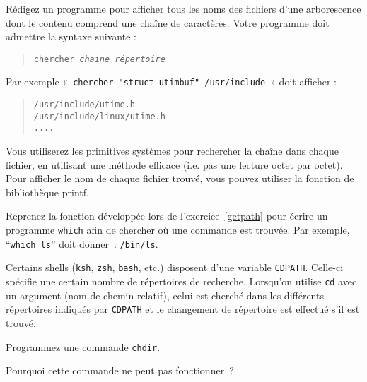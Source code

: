 Rédigez un programme pour afficher tous les noms des fichiers d'une
arborescence dont le contenu comprend une chaîne de caractères. Votre
programme doit admettre la syntaxe suivante :

\begin {quote}
\texttt {chercher \emph {chaine répertoire}}
\end {quote}

Par exemple «~\verb|chercher "struct utimbuf" /usr/include|~»
doit afficher :

\begin {quote}
\begin {verbatim}
/usr/include/utime.h
/usr/include/linux/utime.h
....
\end{verbatim}
\end {quote}

Vous utiliserez les primitives systèmes pour rechercher la chaîne dans
chaque fichier, en utilisant une méthode efficace (i.e. pas une lecture
octet par octet). Pour afficher le nom de chaque fichier trouvé, vous
pouvez utiliser la fonction de bibliothèque printf.

\question

Reprenez la fonction développée lors de l'exercice~\ref {getpath} pour écrire
un programme {\tt which} afin de chercher où une commande est trouvée.
Par exemple, ``{\tt which~ls}'' doit donner~: {\tt /bin/ls}.


\question

Certains shells (\texttt {ksh}, \texttt {zsh}, {\tt bash}, etc.)
disposent d'une variable \texttt {CDPATH}.  Celle-ci
spécifie une certain nombre de répertoires de recherche.  Lorsqu'on
utilise {\tt cd} avec un argument (nom de chemin relatif), celui est
cherché dans les différents répertoires indiqués par {\tt CDPATH} et le
changement de répertoire est effectué s'il est trouvé.

Programmez une commande {\tt chdir}.

Pourquoi cette commande ne peut pas fonctionner~?


